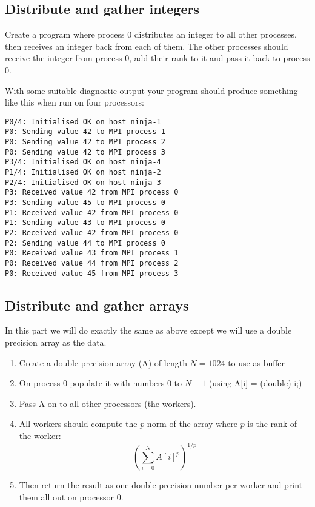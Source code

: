\documentclass[12pt]{article}
\begin{document}
\subsection*{Distribute and gather integers}

Create a program where process 0 distributes an integer to all other processes,
then receives an integer back from each of them.
The other processes should receive the integer from process 0, add their 
rank to it and pass it back to process 0.

With some suitable diagnostic output your program should produce 
something like this when run on four processors: 

\begin{verbatim} 
P0/4: Initialised OK on host ninja-1
P0: Sending value 42 to MPI process 1
P0: Sending value 42 to MPI process 2
P0: Sending value 42 to MPI process 3
P3/4: Initialised OK on host ninja-4
P1/4: Initialised OK on host ninja-2
P2/4: Initialised OK on host ninja-3
P3: Received value 42 from MPI process 0
P3: Sending value 45 to MPI process 0
P1: Received value 42 from MPI process 0
P1: Sending value 43 to MPI process 0
P2: Received value 42 from MPI process 0
P2: Sending value 44 to MPI process 0
P0: Received value 43 from MPI process 1
P0: Received value 44 from MPI process 2
P0: Received value 45 from MPI process 3
\end{verbatim}


\subsection*{Distribute and gather arrays}

In this part we will do exactly the same as above except we will use
a double precision array as the data.

\begin{enumerate}
  \item Create a double precision array (A) of length $N=1024$ to use as buffer
  \item On process 0 populate it with numbers $0$ to $N-1$ 
  (using A[i] = (double) i;) 
  \item Pass A on to all other processors (the workers).
  \item All workers should compute the $p$-norm of the array
  where $p$ is the rank of the worker:
  \[
    \left(
      \sum_{i=0}^N A[i]^p
    \right)^{1/p}
  \]
  \item Then return the result as one double precision number per worker and 
  print them all out on processor 0.
\end{enumerate} 
\end{document}
